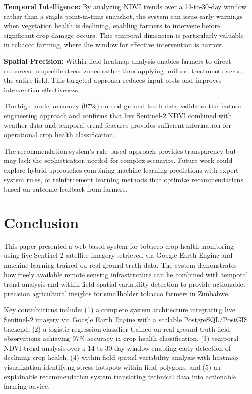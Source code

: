 \documentclass[journal]{IEEEtran}
\begin{document}
\textbf{Temporal Intelligence:} By analyzing NDVI trends over a 14-to-30-day window rather than a single point-in-time snapshot, the system can issue early warnings when vegetation health is declining, enabling farmers to intervene before significant crop damage occurs. This temporal dimension is particularly valuable in tobacco farming, where the window for effective intervention is narrow.

\textbf{Spatial Precision:} Within-field heatmap analysis enables farmers to direct resources to specific stress zones rather than applying uniform treatments across the entire field. This targeted approach reduces input costs and improves intervention effectiveness.

The high model accuracy (97\%) on real ground-truth data validates the feature engineering approach and confirms that live Sentinel-2 NDVI combined with weather data and temporal trend features provides sufficient information for operational crop health classification.

The recommendation system's rule-based approach provides transparency but may lack the sophistication needed for complex scenarios. Future work could explore hybrid approaches combining machine learning predictions with expert system rules, or reinforcement learning methods that optimize recommendations based on outcome feedback from farmers.

\section{Conclusion}

This paper presented a web-based system for tobacco crop health monitoring using live Sentinel-2 satellite imagery retrieved via Google Earth Engine and machine learning trained on real ground-truth data. The system demonstrates how freely available remote sensing infrastructure can be combined with temporal trend analysis and within-field spatial variability detection to provide actionable, precision agricultural insights for smallholder tobacco farmers in Zimbabwe.

Key contributions include: (1) a complete system architecture integrating live Sentinel-2 imagery via Google Earth Engine with a scalable PostgreSQL/PostGIS backend, (2) a logistic regression classifier trained on real ground-truth field observations achieving 97\% accuracy in crop health classification, (3) temporal NDVI trend analysis over a 14-to-30-day window enabling early detection of declining crop health, (4) within-field spatial variability analysis with heatmap visualization identifying stress hotspots within field polygons, and (5) an explainable recommendation system translating technical data into actionable farming advice.
\end{document}
